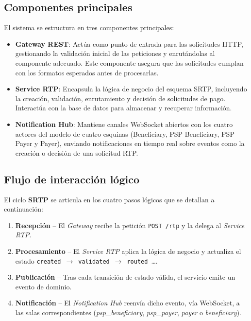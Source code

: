 \subsection{Componentes principales}
\label{subsec:componentes_principales}
El sistema se estructura en tres componentes principales:
\begin{itemize}
  \item \textbf{Gateway REST}: Actúa como punto de entrada para las solicitudes HTTP, gestionando la validación inicial de las peticiones y enrutándolas al componente adecuado. Este componente asegura que las solicitudes cumplan con los formatos esperados antes de procesarlas.
  \item \textbf{Service RTP}: Encapsula la lógica de negocio del esquema SRTP, incluyendo la creación, validación, enrutamiento y decisión de solicitudes de pago. Interactúa con la base de datos para almacenar y recuperar información.
  \item \textbf{Notification Hub}: Mantiene canales WebSocket abiertos con los cuatro actores del modelo de cuatro esquinas (Beneficiary, PSP Beneficiary, PSP Payer y Payer), enviando notificaciones en tiempo real sobre eventos como la creación o decisión de una solicitud RTP.
\end{itemize}

\subsection{Flujo de interacción lógico}
\label{subsec:flujo_interaccion}

El ciclo \textbf{SRTP} se articula en los cuatro pasos lógicos que se detallan a continuación:

\begin{enumerate}[label=\arabic*.]
  \item \textbf{Recepción} – El \emph{Gateway} recibe la petición
        \verb|POST /rtp| y la delega al \emph{Service RTP}.
  \item \textbf{Procesamiento} – El \emph{Service RTP} aplica la lógica de negocio
        y actualiza el estado
        \mbox{\texttt{created} $\rightarrow$ \texttt{validated} $\rightarrow$ \texttt{routed} …}.
  \item \textbf{Publicación} – Tras cada transición de estado válida,
        el servicio emite un evento de dominio.
  \item \textbf{Notificación} – El \emph{Notification Hub} reenvía dicho evento,
        vía WebSocket, a las salas correspondientes
        (\emph{psp\_beneficiary}, \emph{psp\_payer}, \emph{payer} o \emph{beneficiary}).
\end{enumerate}

